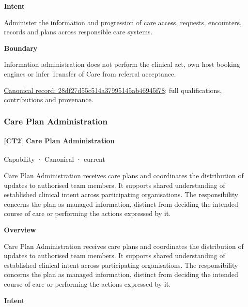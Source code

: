 \textbf{Intent}



Administer the information and progression of care access, requests, encounters, records and plans across responsible care systems.



\textbf{Boundary}



Information administration does not perform the clinical act, own host booking engines or infer Transfer of Care from referral acceptance.


{\footnotesize \href{../../../../continuum/strategy/capability/28df27d55c514a37995145ab46945f78.md}{Canonical record: 28df27d55c514a37995145ab46945f78}; full qualifications, contributions and provenance.}\par
\subsubsection{Care Plan Administration}

\paragraph{[CT2] Care Plan Administration}

\label{element:cf06eec5699f406fa30a00d2f76e3098}
{\small Capability · Canonical · current}\par

Care Plan Administration receives care plans and coordinates the distribution of updates to authorised team members. It supports shared understanding of established clinical intent across participating organisations. The responsibility concerns the plan as managed information, distinct from deciding the intended course of care or performing the actions expressed by it.



\textbf{Overview}



Care Plan Administration receives care plans and coordinates the distribution of updates to authorised team members. It supports shared understanding of established clinical intent across participating organisations. The responsibility concerns the plan as managed information, distinct from deciding the intended course of care or performing the actions expressed by it.



\textbf{Intent}



